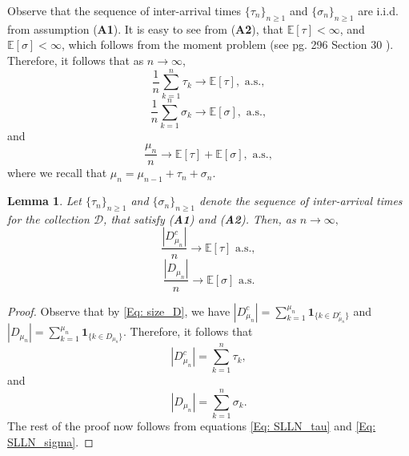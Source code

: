 \documentclass{article}
\numberwithin{equation}{section}
\newtheorem{lemma}[theorem]{Lemma}
\newcommand{\DD}{\mbox{${\mathcal D}$}}
\newcommand{\1}{\mathbf{1}}
\newcommand{\0}{\mathbf{0}}
\newcommand{\bone}{\mathbf{1}}
\newcommand{\E}{\mbox{${\mathbb E}$}}
\begin{document}
Observe that the sequence of inter-arrival times $\{\tau_n\}_{n \ge 1}$ and $\{\sigma_n\}_{n \ge 1}$ are i.i.d. from assumption (\textbf{A1}). It is easy to see from (\textbf{A2}), that $\E\left[\tau\right] < \infty$, and $\E \left[\sigma\right]<\infty$, which follows from the moment problem (see pg. 296 Section 30 \cite{Bil_2012}). Therefore, it follows that as $n \to \infty$,
\begin{equation}
\label{Eq: SLLN_tau}
\frac{1}{n}\sum_{k=1}^n \tau_k \longrightarrow \E\left[\tau\right], \text{ a.s.},  
\end{equation}
\begin{equation}
\label{Eq: SLLN_sigma}
\frac{1}{n}\sum_{k=1}^n \sigma_k \longrightarrow \E\left[\sigma\right], \text{ a.s.},  
\end{equation}
and 
\begin{equation}
\label{Eq: SLLN_mu}
\frac{\mu_n}{n} \longrightarrow \E\left[\tau\right]+\E\left[\sigma\right], \text{ a.s.}, 
\end{equation}
where we recall that $\mu_n= \mu_{n-1}+\tau_n+\sigma_n$.
\begin{lemma}
\label{Lem: SLLN for D}
Let $\{\tau_n\}_{n \ge 1}$ and $\{\sigma_n\}_{n \ge 1}$ denote the sequence of inter-arrival times for the collection $\DD$, that satisfy (\textbf{A1}) and (\textbf{A2}). Then, as $n \to \infty,$
\begin{equation}
\label{Eq: SLLN_D_c}
\frac{|D^c_{\mu_n}|}{n}
\longrightarrow \E\left[\tau \right] \text{ a.s.}, 
\end{equation}
\begin{equation}
\label{Eq: SLLN_D}
 \frac{|D_{\mu_n}|}{n}\longrightarrow \E\left[\sigma \right] \text{ a.s.}
\end{equation}
\end{lemma}
\begin{proof}
Observe that by \eqref{Eq: size_D}, we have $|D^c_{\mu_n}|= \sum_{k=1}^{\mu_n} \bone_{\{k \in D^c_{\mu_n}\}}$ and 
$|D_{\mu_n}| = \sum_{k=1}^{\mu_n} \bone_{\{k \in D_{\mu_n}\}}$. Therefore, it follows that 
\[
|D^c_{\mu_n}|= \sum_{k = 1}^n \tau_k,
\]
and 
\[
|D_{\mu_n}|= \sum_{k = 1}^n \sigma_k.
\]
The rest of the proof now follows from equations \eqref{Eq: SLLN_tau} and \eqref{Eq: SLLN_sigma}.
\end{proof}
\end{document}
